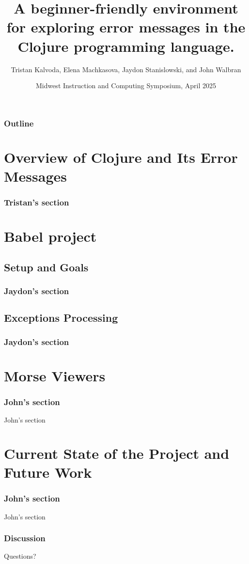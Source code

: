 \documentclass{beamer}
\begin{document}
\title{A beginner-friendly environment for exploring error messages in the Clojure programming language.}
\author{Tristan Kalvoda, Elena Machkasova, Jaydon Stanislowski, and John Walbran}
\date[]  
{Midwest Instruction and Computing Symposium, April 2025}

\begin{frame}
  \titlepage
\end{frame}

\begin{frame}

  \frametitle{Outline}
\tableofcontents
\end{frame}

\section{Overview of Clojure and Its Error Messages}

\begin{frame}
\frametitle{Tristan's section}

\end{frame}

\section{Babel project}

\subsection{Setup and Goals}

\begin{frame}
\frametitle{Jaydon's section}

\end{frame}

\subsection{Exceptions Processing}

\begin{frame}
\frametitle{Jaydon's section}

\end{frame}

\section{Morse Viewers}

\begin{frame}
\frametitle{John's section}

John's section
\end{frame}

\section{Current State of the Project and Future Work}

\begin{frame}
\frametitle{John's section}

John's section
\end{frame}

\begin{frame}
  \frametitle{Discussion}
Questions?
\end{frame}
\end{document}
